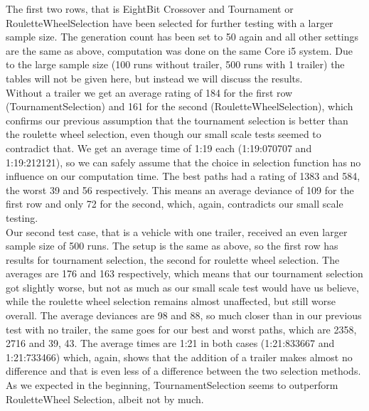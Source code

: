The first two rows, that is EightBit Crossover and Tournament or RouletteWheelSelection have been selected for further testing with a larger sample size. The generation count has been set to 50 again and all other settings are the same as above, computation was done on the same Core i5 system. Due to the large sample size (100 runs without trailer, 500 runs with 1 trailer) the tables will not be given here, but instead we will discuss the results.
\\
Without a trailer we get an average rating of 184 for the first row (TournamentSelection) and 161 for the second (RouletteWheelSelection), which confirms our previous assumption that the tournament selection is better than the roulette wheel selection, even though our small scale tests seemed to contradict that. We get an average time of 1:19 each (1:19:070707 and 1:19:212121), so we can safely assume that the choice in selection function has no influence on our computation time. The best paths had a rating of 1383 and 584, the worst 39 and 56 respectively. This means an average deviance of 109 for the first row and only 72 for the second, which, again, contradicts our small scale testing.
\\
Our second test case, that is a vehicle with one trailer, received an even larger sample size of 500 runs. The setup is the same as above, so the first row has results for tournament selection, the second for roulette wheel selection. The averages are 176 and 163 respectively, which means that our tournament selection got slightly worse, but not as much as our small scale test would have us believe, while the roulette wheel selection remains almost unaffected, but still worse overall. The average deviances are 98 and 88, so much closer than in our previous test with no trailer, the same goes for our best and worst paths, which are 2358, 2716 and 39, 43. The average times are 1:21 in both cases (1:21:833667 and 1:21:733466) which, again, shows that the addition of a trailer makes almost no difference and that is even less of a difference between the two selection methods.\\
As we expected in the beginning, TournamentSelection seems to outperform RouletteWheel Selection, albeit not by much.